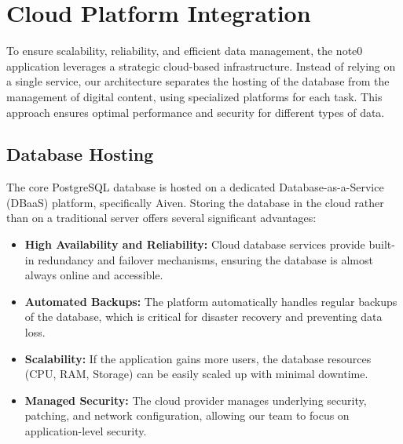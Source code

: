\documentclass[12pt, a4paper]{report}
\begin{document}
\section{Cloud Platform Integration}
To ensure scalability, reliability, and efficient data management, the note0 application leverages a strategic cloud-based infrastructure. Instead of relying on a single service, our architecture separates the hosting of the database from the management of digital content, using specialized platforms for each task. This approach ensures optimal performance and security for different types of data.

\subsection{Database Hosting}
The core PostgreSQL database is hosted on a dedicated Database-as-a-Service (DBaaS) platform, specifically Aiven. Storing the database in the cloud rather than on a traditional server offers several significant advantages:
\begin{itemize}
    \item \textbf{High Availability and Reliability:} Cloud database services provide built-in redundancy and failover mechanisms, ensuring the database is almost always online and accessible.
    \item \textbf{Automated Backups:} The platform automatically handles regular backups of the database, which is critical for disaster recovery and preventing data loss.
    \item \textbf{Scalability:} If the application gains more users, the database resources (CPU, RAM, Storage) can be easily scaled up with minimal downtime.
    \item \textbf{Managed Security:} The cloud provider manages underlying security, patching, and network configuration, allowing our team to focus on application-level security.
\end{itemize}
\end{document}
